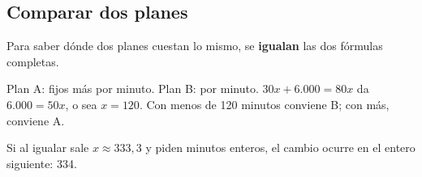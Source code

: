 \subsection{Comparar dos planes}
Para saber dónde dos planes cuestan lo mismo, se \textbf{igualan} las dos fórmulas completas.
\par\noindent\begin{minipage}{0.55\linewidth}
\begin{ejemplo} Plan A:  fijos más  por minuto. Plan B:  por minuto. $30x + 6.000 = 80x$ da $6.000 = 50x$, o sea $x = 120$. Con menos de 120 minutos conviene B; con más, conviene A.\end{ejemplo}
\begin{ojo} Si al igualar sale $x \approx 333{,}3$ y piden minutos enteros, el cambio ocurre en el entero siguiente: 334.\end{ojo}
\end{minipage}\hfill
\begin{minipage}{0.4\linewidth}\centering
{}
\end{minipage}

